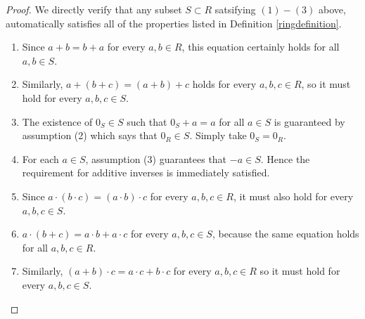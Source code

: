 \documentclass[11pt,fleqn,dvipsnames,usenames]{article}
\begin{document}
\begin{proof}
We directly verify that any subset $S\subset R$ satsifying $(1)-(3)$ above, automatically satisfies all of the properties listed in Definition \ref{ringdefinition}.
\begin{enumerate}[(1)]
\item Since $a + b = b + a$ for every $a,b\in R$, this equation certainly holds for all $a,b\in S$.
\item Similarly, $a + (b +c)  = (a + b) + c$ holds for every $a,b,c\in R$, so it must hold for every $a,b,c\in S$.
\item The existence of $0_{S}\in S$ such that $0_{S} + a = a$ for all $a\in S$ is guaranteed by assumption (2) which says that $0_R\in S$.  Simply take $0_S = 0_R$.
\item For each $a\in S$, assumption (3) guarantees that $-a\in S$.  Hence the requirement for additive inverses is immediately satisfied.
\item Since $a\cdot(b\cdot c) = (a\cdot b)\cdot c$ for every $a,b,c\in R$, it must also hold for every $a,b,c\in S$.
\item $a\cdot (b + c) = a\cdot b + a\cdot c$ for every $a,b,c\in S$, because the same equation holds for all $a,b,c\in R$.
\item Similarly, $(a + b)\cdot c = a\cdot c + b\cdot c$ for every $a,b,c\in R$ so it must hold for every $a,b,c\in S$.\qedhere
\end{enumerate}
\end{proof}
\smsp
\end{document}
